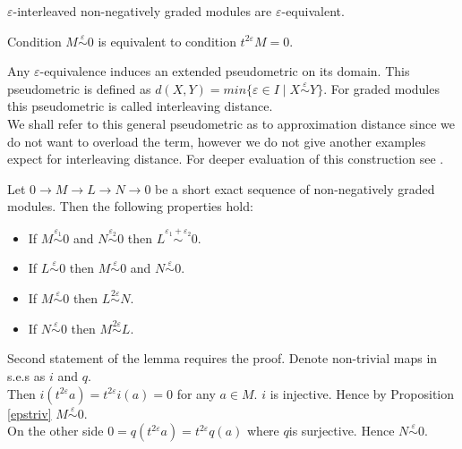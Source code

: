 \begin{proposition}
  $\varepsilon$-interleaved non-negatively graded modules are $\varepsilon$-equivalent.
\end{proposition}

\begin{proposition} {\cite[Proposition 2.13]{GS16}}
  \label{epstriv}
  Condition $M \stackrel{\varepsilon}{\sim} 0$ is equivalent to condition $t^{2\varepsilon}M = 0$.
\end{proposition}

\begin{definition}
  Any $\varepsilon$-equivalence induces an extended pseudometric on its domain. This pseudometric is defined as $d(X,Y) = min\{\varepsilon \in I\;|\;X \stackrel{\varepsilon}{\sim} Y\}$. For graded modules this pseudometric is called interleaving distance. {\cite[Definition 2.12]{GS16}}\\
  We shall refer to this general pseudometric as to approximation distance since we do not want to overload the term, however we do not give another examples expect for interleaving distance. For deeper evaluation of this construction see {\cite{deSilva18}}.
\end{definition}

\begin{lemma}
  \label{ops}
  Let $0 \to M \to L \to N \to 0$ be a short exact sequence of non-negatively graded modules. Then the following properties hold:
  \begin{itemize}
    \item If $M \stackrel{\varepsilon_1}{\sim} 0$ and $N \stackrel{\varepsilon_2}{\sim} 0$ then $L \stackrel{\varepsilon_1 + \varepsilon_2}{\sim} 0$. {\cite[Proposition 4.6]{GS16}}
    \item If $L \stackrel{\varepsilon}{\sim} 0$ then $M \stackrel{\varepsilon}{\sim} 0$ and $N \stackrel{\varepsilon}{\sim} 0$.
    \item If $M \stackrel{\varepsilon}{\sim} 0$ then $L \stackrel{2\varepsilon}{\sim} N$. {\cite[Proposition 4.1]{GS16}}
    \item If $N \stackrel{\varepsilon}{\sim} 0$ then $M \stackrel{2\varepsilon}{\sim} L$. {\cite[Proposition 4.1]{GS16}}
  \end{itemize}
\end{lemma}

\begin{pf}
  Second statement of the lemma requires the proof. Denote non-trivial maps in s.e.s as $i$ and $q$.\\

  Then $i(t^{2\varepsilon}a) = t^{2\varepsilon}i(a) = 0$ for any $a \in M$. $i$ is injective. Hence by Proposition \ref{epstriv} $M \stackrel{\varepsilon}{\sim} 0$.\\

  On the other side $0 = q(t^{2\varepsilon}a) = t^{2\varepsilon}q(a)$ where $q$is surjective. Hence $N \stackrel{\varepsilon}{\sim} 0$.
\end{pf}
